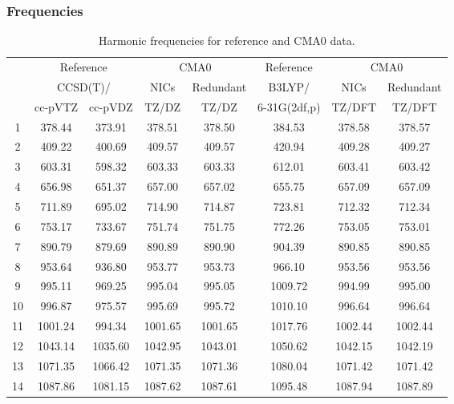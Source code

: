 \documentclass[10pt,oneside]{article}
\begin{document}
\begin{table}[h!]
\subsubsection*{Frequencies}
\centering
\caption{Harmonic frequencies for reference and CMA0 data.}
\begin{tabular}{cccccccc}
\toprule
{} & \multicolumn{2}{c}{Reference} & \multicolumn{2}{c}{CMA0} &    Reference & \multicolumn{2}{c}{CMA0} \\
{} & \multicolumn{2}{c}{CCSD(T)/} &    NICs &  Redundant &       B3LYP/ &    NICs & Redundant \\
{} &   cc-pVTZ & cc-pVDZ &   TZ/DZ &      TZ/DZ & 6-31G(2df,p) &  TZ/DFT &    TZ/DFT \\
\midrule
1  &    378.44 &  373.91 &  378.51 &     378.50 &       384.53 &  378.58 &    378.57 \\
2  &    409.22 &  400.69 &  409.57 &     409.57 &       420.94 &  409.28 &    409.27 \\
3  &    603.31 &  598.32 &  603.33 &     603.33 &       612.01 &  603.41 &    603.42 \\
4  &    656.98 &  651.37 &  657.00 &     657.02 &       655.75 &  657.09 &    657.09 \\
5  &    711.89 &  695.02 &  714.90 &     714.87 &       723.81 &  712.32 &    712.34 \\
6  &    753.17 &  733.67 &  751.74 &     751.75 &       772.26 &  753.05 &    753.01 \\
7  &    890.79 &  879.69 &  890.89 &     890.90 &       904.39 &  890.85 &    890.85 \\
8  &    953.64 &  936.80 &  953.77 &     953.73 &       966.10 &  953.56 &    953.56 \\
9  &    995.11 &  969.25 &  995.04 &     995.05 &      1009.72 &  994.99 &    995.00 \\
10 &    996.87 &  975.57 &  995.69 &     995.72 &      1010.10 &  996.64 &    996.64 \\
11 &   1001.24 &  994.34 & 1001.65 &    1001.65 &      1017.76 & 1002.44 &   1002.44 \\
12 &   1043.14 & 1035.60 & 1042.95 &    1043.01 &      1050.62 & 1042.15 &   1042.19 \\
13 &   1071.35 & 1066.42 & 1071.35 &    1071.36 &      1080.04 & 1071.42 &   1071.42 \\
14 &   1087.86 & 1081.15 & 1087.62 &    1087.61 &      1095.48 & 1087.94 &   1087.89 \\

\end{tabular}
\end{table}
\end{document}
